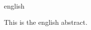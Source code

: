 \begin{otherlanguage*}{english}
\begin{resumo}[Abstract]

    This is the english abstract.


\end{resumo}
\end{otherlanguage*}











